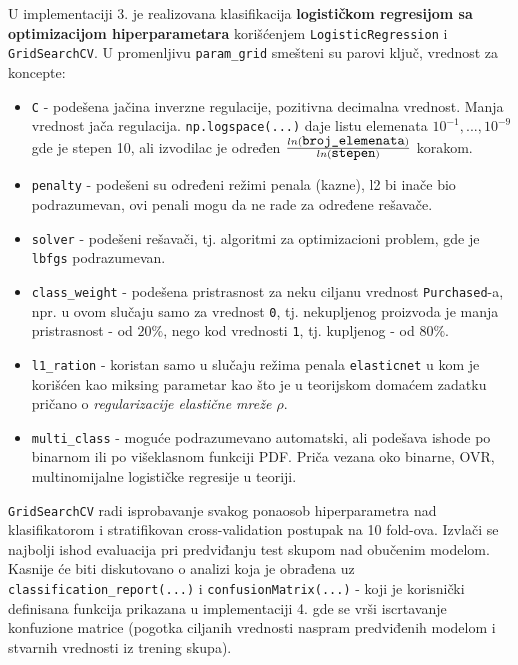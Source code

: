 \documentclass[fontsize=12bp, paper=a4]{scrarticle}
\begin{document}
\newpage
U implementaciji 3. je realizovana klasifikacija \textbf{logističkom regresijom sa optimizacijom hiperparametara} korišćenjem \verb|LogisticRegression|\cite{LR} i \verb|GridSearchCV|\cite{GCV}. U promenljivu \verb|param_grid| smešteni su parovi ključ, vrednost za koncepte:
\begin{itemize}
    \item \verb*|C| - podešena jačina inverzne regulacije, pozitivna decimalna vrednost. Manja vrednost jača regulacija. \verb|np.logspace(...)| daje listu elemenata $10^{-1}, ..., 10^{-9}$ gde je stepen 10, ali izvodilac je određen $ln(\verb|broj_elemenata|) \over ln(\verb|stepen|)$ korakom.\cite{npLogspace}
    \item \verb*|penalty| - podešeni su određeni režimi penala (kazne), l2 bi inače bio podrazumevan, ovi penali mogu da ne rade za određene rešavače.
    \item \verb|solver| - podešeni rešavači, tj. algoritmi za optimizacioni problem, gde je \verb*|lbfgs| podrazumevan.
    \item \verb*|class_weight| - podešena pristrasnost za neku ciljanu vrednost \verb*|Purchased|-a, npr. u ovom slučaju samo za vrednost \verb*|0|, tj. nekupljenog proizvoda je manja pristrasnost - od $20\%$, nego kod vrednosti \verb|1|, tj. kupljenog - od $80\%$.
    \item \verb|l1_ration| - koristan samo u slučaju režima penala \verb|elasticnet| u kom je korišćen kao miksing parametar kao što je u teorijskom domaćem zadatku pričano o \textit{regularizacije elastične mreže $\rho$}. 
    \item \verb*|multi_class| - moguće podrazumevano automatski, ali podešava ishode po binarnom ili po višeklasnom funkciji PDF. Priča vezana oko binarne, OVR, multinomijalne logističke regresije u teoriji. 
\end{itemize} 
\verb*|GridSearchCV| radi isprobavanje svakog ponaosob hiperparametra nad klasifikatorom i stratifikovan cross-validation postupak na 10 fold-ova. Izvlači se najbolji ishod evaluacija pri predviđanju test skupom nad obučenim modelom. Kasnije će biti diskutovano o analizi koja je obrađena uz \verb|classification_report(...)| i \verb|confusionMatrix(...)| - koji je korisnički definisana funkcija prikazana u implementaciji 4. gde se vrši iscrtavanje konfuzione matrice (pogotka ciljanih vrednosti naspram predviđenih modelom i stvarnih vrednosti iz trening skupa).
\end{document}
